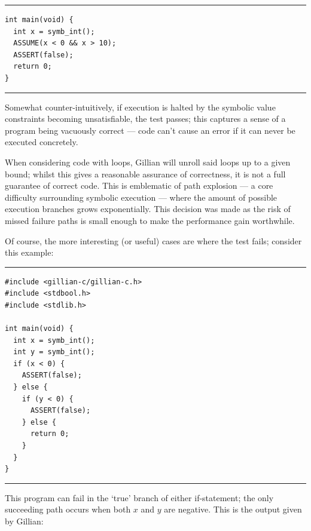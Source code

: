 \noindent\rule{\textwidth}{0.5pt}
\vspace{-0.6cm}
\begin{verbatim}
int main(void) {
  int x = symb_int();
  ASSUME(x < 0 && x > 10);
  ASSERT(false);
  return 0;
}
\end{verbatim}
\vspace{-0.4cm}
\noindent\rule{\textwidth}{0.5pt}
\vspace{-0.6cm}
\vspace{0.5cm}

Somewhat counter-intuitively, if execution is halted by the symbolic value
constraints becoming unsatisfiable, the test passes; this captures a sense of
a program being vacuously correct --- code can't cause an error if it can never
be executed concretely.

When considering code with loops, Gillian will unroll said loops up to a given
bound; whilst this gives a reasonable assurance of correctness, it is not a full
guarantee of correct code. This is emblematic of path explosion --- a core
difficulty surrounding symbolic execution --- where the amount of possible
execution branches grows exponentially. This decision was made as the risk of
missed failure paths is small enough to make the performance gain worthwhile.

Of course, the more interesting (or useful) cases are where the test fails;
consider this example:

\noindent\rule{\textwidth}{0.5pt}
\vspace{-0.6cm}
\begin{verbatim}
#include <gillian-c/gillian-c.h>
#include <stdbool.h>
#include <stdlib.h>

int main(void) {
  int x = symb_int();
  int y = symb_int();
  if (x < 0) {
    ASSERT(false);
  } else {
    if (y < 0) {
      ASSERT(false);
    } else {
      return 0;
    }
  }
}
\end{verbatim}
\vspace{-0.4cm}
\noindent\rule{\textwidth}{0.5pt}
\vspace{-0.6cm}
\vspace{0.5cm}

This program can fail in the `true' branch of either if-statement; the only
succeeding path occurs when both $x$ and $y$ are negative. This is the output
given by Gillian:

